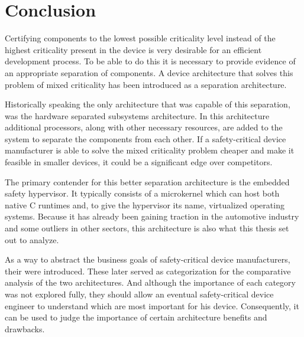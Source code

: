 
\section{Conclusion}
Certifying components to the lowest possible criticality level instead of the highest criticality present in the device is very desirable for an efficient development process. To be able to do this it is necessary to provide evidence of an appropriate separation of components. A device architecture that solves this problem of mixed criticality has been introduced as a separation architecture.

Historically speaking the only architecture that was capable of this separation, was the hardware separated subsystems architecture. In this architecture additional processors, along with other necessary resources, are added to the system to separate the components from each other. If a safety-critical device manufacturer is able to solve the mixed criticality problem cheaper and make it feasible in smaller devices, it could be a significant edge over competitors.

The primary contender for this better separation architecture is the embedded safety hypervisor. It typically consists of a microkernel which can host both native C runtimes and, to give the hypervisor its name, virtualized operating systems. Because it has already been gaining traction in the automotive industry and some outliers in other sectors, this architecture is also what this thesis set out to analyze.

As a way to abstract the business goals of safety-critical device manufacturers, their  were introduced. These later served as categorization for the comparative analysis of the two architectures. And although the importance of each category was not explored fully, they should allow an eventual safety-critical device engineer to understand which are most important for his device. Consequently, it can be used to judge the importance of certain architecture benefits and drawbacks.

